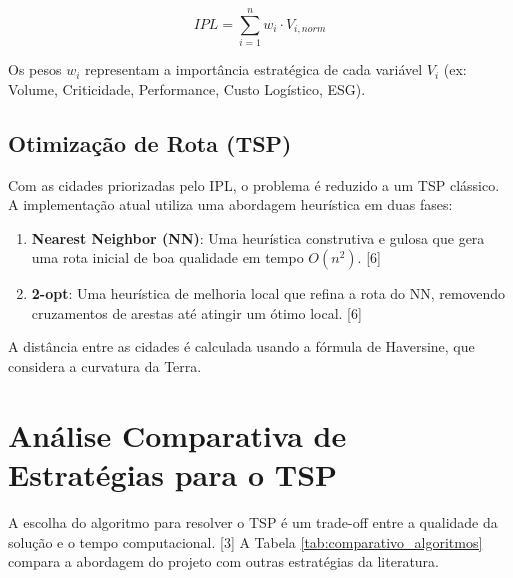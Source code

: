 \documentclass[11pt,a4paper,twocolumn]{article}
\begin{document}
$$ IPL = \sum_{i=1}^{n} w_i \cdot V_{i,norm} $$

Os pesos $w_i$ representam a importância estratégica de cada variável $V_i$ (ex: Volume, Criticidade, Performance, Custo Logístico, ESG).

\subsection{Otimização de Rota (TSP)}
Com as cidades priorizadas pelo IPL, o problema é reduzido a um TSP clássico. A implementação atual utiliza uma abordagem heurística em duas fases:
\begin{enumerate}
    \item \textbf{Nearest Neighbor (NN)}: Uma heurística construtiva e gulosa que gera uma rota inicial de boa qualidade em tempo $O(n^2)$. [6]
    \item \textbf{2-opt}: Uma heurística de melhoria local que refina a rota do NN, removendo cruzamentos de arestas até atingir um ótimo local. [6]
\end{enumerate}

A distância entre as cidades é calculada usando a fórmula de Haversine, que considera a curvatura da Terra.

\section{Análise Comparativa de Estratégias para o TSP}

A escolha do algoritmo para resolver o TSP é um trade-off entre a qualidade da solução e o tempo computacional. [3] A Tabela \ref{tab:comparativo_algoritmos} compara a abordagem do projeto com outras estratégias da literatura.
\end{document}
